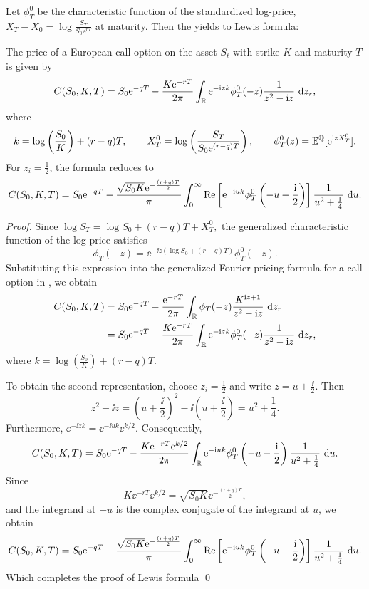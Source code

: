 Let $\phi_{T}^{0}$ be the characteristic function of the standardized log-price, $X_T - X_0 = \log
\frac{S_T}{S_0 \ee^{rT}}$ at maturity. Then the  yields to Lewis formula: 
\begin{theorem}
  The price of a European call option on the asset $S_t$ with strike
  $K$ and maturity $T$ is given by
  \[
    C(S_0,K,T)
    = S_0\text{e}^{-qT}
    - \frac{K\text{e}^{-rT}}{2\pi}
    \int_{\mathbb{R}}
    \text{e}^{-\text{i} zk}\phi_T^0(-z)
    \frac{1}{z^2-\text{i} z}\text{ d} z_r,
  \]
  where
  \[
    k=\log\left(\frac{S_0}{K}\right)+(r-q)T,\qquad 
    X_T^0=\log\left(\frac{S_T}{S_0\text{e}^{(r-q)T}}\right),
    \qquad
    \phi_T^0(z)=\mathbb{E}^{\mathbb{Q}}[\text{e}^{\text{i} zX_T^0}].
  \]
  For $z_i=\frac{1}{2}$, the formula reduces to
  \[
    C(S_0,K,T)
    = S_0\text{e}^{-qT}
    - \frac{\sqrt{S_0K}\text{e}^{-\frac{(r+q)T}{2}}}{\pi}
    \int_0^\infty
    \operatorname{Re}\left[
      \text{e}^{-\text{i} uk}
      \phi_T^0\left(-u-\frac{\text{i}}{2}\right)
    \right]
    \frac{1}{u^2+\frac{1}{4}}\text{ d} u.
  \]
\end{theorem}

\begin{proof}
  Since $\log S_T=\log S_0+(r-q)T+X_T^0,$ the generalized characteristic function of the log-price
  satisfies
  \[
    \phi_T(-z)
    =\ee^{-\ii z(\log S_0+(r-q)T)}\phi_T^0(-z).
  \]
  Substituting this expression into the generalized Fourier pricing formula for a call option in
  , we obtain
  \begin{align*}
    C(S_0,K,T)
    &=S_0\text{e}^{-qT}
    -\frac{\text{e}^{-rT}}{2\pi}
    \int_{\mathbb{R}}
    \phi_T(-z)
    \frac{K^{\text{i} z+1}}{z^2-\text{i} z}\text{ d} z_r\\
    &=S_0\text{e}^{-qT}
    -\frac{K\text{e}^{-rT}}{2\pi}
    \int_{\mathbb{R}}
    \text{e}^{-\text{i} zk}\phi_T^0(-z)
    \frac{1}{z^2-\text{i} z}\text{ d} z_r,
  \end{align*}
  where $k=\log\left(\frac{S_0}{K}\right)+(r-q)T.$ 

  To obtain the second representation, choose $z_i=\frac{1}{2}$ and write $z=u+\frac{\ii}{2}$. Then
  \[
    z^2-\ii z
    =\left(u+\frac{\ii}{2}\right)^2
      -\ii\left(u+\frac{\ii}{2}\right)
    =u^2+\frac{1}{4}.
  \]
  Furthermore, $\ee^{-\ii zk} =\ee^{-\ii uk}\ee^{k/2}.$ Consequently,
  \[
    C(S_0,K,T)
    =S_0\text{e}^{-qT}
    -\frac{K\text{e}^{-rT}\text{e}^{k/2}}{2\pi}
    \int_{\mathbb{R}}
    \text{e}^{-\text{i} uk}
    \phi_T^0\left(-u-\frac{\text{i}}{2}\right)
    \frac{1}{u^2+\frac{1}{4}}\text{ d} u.
  \]
  Since
  \[
    K\ee^{-rT}\ee^{k/2}
    =\sqrt{S_0K}\ee^{-\frac{(r+q)T}{2}},
  \]
  and the integrand at $-u$ is the complex conjugate of the
  integrand at $u$, we obtain
  \[
    C(S_0,K,T)
    =S_0\text{e}^{-qT}
    -\frac{\sqrt{S_0K}\text{e}^{-\frac{(r+q)T}{2}}}{\pi}
    \int_0^\infty
    \operatorname{Re}\left[
      \text{e}^{-\text{i} uk}
      \phi_T^0\left(-u-\frac{\text{i}}{2}\right)
    \right]
    \frac{1}{u^2+\frac{1}{4}}\text{ d} u.
  \]
  Which completes the proof of Lewis formula
  \qed
\end{proof}

